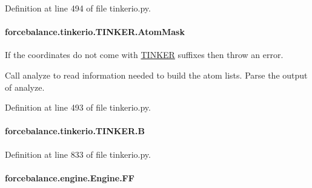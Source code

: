 Definition at line 494 of file tinkerio.\-py.

\hypertarget{classforcebalance_1_1tinkerio_1_1TINKER_a17a5941d3b43e4b8671c38fb2683c074}{
\paragraph[{Atom\-Mask}]{\setlength{\rightskip}{0pt plus 5cm}forcebalance.\-tinkerio.\-T\-I\-N\-K\-E\-R.\-Atom\-Mask}}\label{classforcebalance_1_1tinkerio_1_1TINKER_a17a5941d3b43e4b8671c38fb2683c074}


If the coordinates do not come with \hyperlink{classforcebalance_1_1tinkerio_1_1TINKER}{T\-I\-N\-K\-E\-R} suffixes then throw an error. 

Call analyze to read information needed to build the atom lists. Parse the output of analyze. 

Definition at line 493 of file tinkerio.\-py.

\hypertarget{classforcebalance_1_1tinkerio_1_1TINKER_a28d1166b702fd00583368dd019bbf67a}{
\paragraph[{B}]{\setlength{\rightskip}{0pt plus 5cm}forcebalance.\-tinkerio.\-T\-I\-N\-K\-E\-R.\-B}}\label{classforcebalance_1_1tinkerio_1_1TINKER_a28d1166b702fd00583368dd019bbf67a}


Definition at line 833 of file tinkerio.\-py.

\hypertarget{classforcebalance_1_1engine_1_1Engine_aeb55142568e89f7a92d745e04ec3c964}{
\paragraph[{F\-F}]{\setlength{\rightskip}{0pt plus 5cm}forcebalance.\-engine.\-Engine.\-F\-F\hspace{0.3cm}{\ttfamily [inherited]}}}\label{classforcebalance_1_1engine_1_1Engine_aeb55142568e89f7a92d745e04ec3c964}


